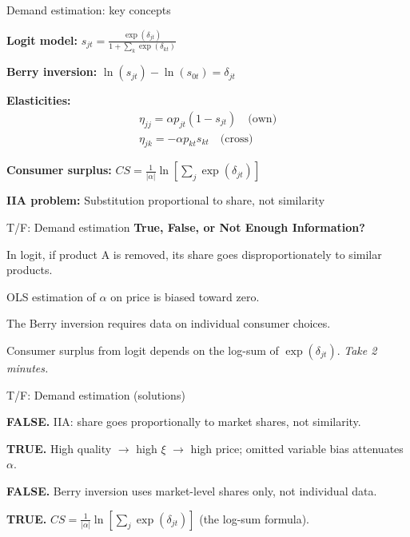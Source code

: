 \documentclass[notes,11pt, aspectratio=169]{beamer}
\newenvironment{wideitemize}{\itemize\addtolength{\itemsep}{10pt}}{\enditemize}
\newenvironment{wideenumerate}{\enumerate\addtolength{\itemsep}{10pt}}{\endenumerate}
\begin{document}
\begin{frame}{Demand estimation: key concepts}
	\begin{wideitemize}
		\item \textbf{Logit model:} $s_{jt} = \frac{\exp(\delta_{jt})}{1 + \sum_k \exp(\delta_{kt})}$
		\item \textbf{Berry inversion:} $\ln(s_{jt}) - \ln(s_{0t}) = \delta_{jt}$
		\item \textbf{Elasticities:}
		\begin{align*}
			\eta_{jj} = \alpha p_{jt} (1 - s_{jt}) \quad \text{(own)} \\
			\eta_{jk} = -\alpha p_{kt} s_{kt} \quad \text{(cross)}
		\end{align*}
		\item \textbf{Consumer surplus:} $CS = \frac{1}{|\alpha|} \ln\left[\sum_j \exp(\delta_{jt})\right]$
		\item \textbf{IIA problem:} Substitution proportional to share, not similarity
	\end{wideitemize}
\end{frame}

\begin{frame}{T/F: Demand estimation}
	\textbf{True, False, or Not Enough Information?}
	\vspace{8pt}
	\begin{wideenumerate}
		\item In logit, if product A is removed, its share goes disproportionately to similar products.
		\item OLS estimation of $\alpha$ on price is biased toward zero.
		\item The Berry inversion requires data on individual consumer choices.
		\item Consumer surplus from logit depends on the log-sum of $\exp(\delta_{jt})$.
	\end{wideenumerate}
	\vspace{8pt}
	\centering
	\textit{Take 2 minutes.}
\end{frame}

\begin{frame}{T/F: Demand estimation (solutions)}
	\begin{wideenumerate}
		\item \textbf{FALSE.} IIA: share goes proportionally to market shares, not similarity.
		\item \textbf{TRUE.} High quality $\rightarrow$ high $\xi$ $\rightarrow$ high price; omitted variable bias attenuates $\alpha$.
		\item \textbf{FALSE.} Berry inversion uses market-level shares only, not individual data.
		\item \textbf{TRUE.} $CS = \frac{1}{|\alpha|} \ln\left[\sum_j \exp(\delta_{jt})\right]$ (the log-sum formula).
	\end{wideenumerate}
\end{frame}
\end{document}
